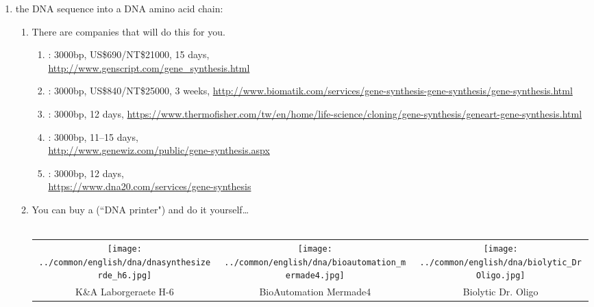 \begin{enumerate}
  \item {} the DNA sequence into a DNA amino acid chain:
    \begin{enumerate}
      \item There are companies that will do this for you.  %
        \begin{enumerate}
          \item {}: 3000bp, US\$690/NT\$21000, 15 days, 
              \\\url{http://www.genscript.com/gene_synthesis.html}
          \item {}: 3000bp, US\$840/NT\$25000, 3 weeks, 
                \url{http://www.biomatik.com/services/gene-synthesis-gene-synthesis/gene-synthesis.html} 
          \item {}: 3000bp, 12 days, 
                \url{https://www.thermofisher.com/tw/en/home/life-science/cloning/gene-synthesis/geneart-gene-synthesis.html}
          \item {}: 3000bp, 11--15 days, 
              \\\url{http://www.genewiz.com/public/gene-synthesis.aspx}
          \item {}:  3000bp, 12 days, 
              \\\url{https://www.dna20.com/services/gene-synthesis}
        \end{enumerate}

      \item You can buy a  (``DNA printer") and do it yourself\ldots\\
          \\\begin{tabular}{*{3}{>{\scs}c}}
             \texttt{[image: ../common/english/dna/dnasynthesizerde\_h6.jpg]}%
            &\texttt{[image: ../common/english/dna/bioautomation\_mermade4.jpg]}%
            &\texttt{[image: ../common/english/dna/biolytic\_DrOligo.jpg]}%
            \\
             K\&A Laborgeraete H-6
            &BioAutomation Mermade4
            &Biolytic Dr. Oligo
          \end{tabular}
    \end{enumerate}


\end{enumerate}
